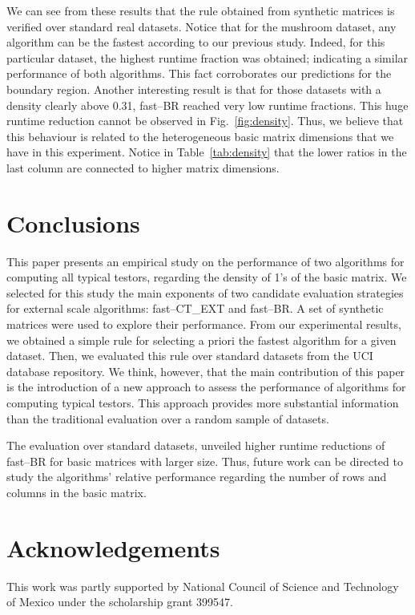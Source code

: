 \documentclass[citenumber]{llncs}
\begin{document}
	We can see from these results that the rule obtained from synthetic matrices is verified over standard real datasets. Notice that for the mushroom dataset, any algorithm can be the fastest according to our previous study. Indeed, for this particular dataset, the highest runtime fraction was obtained; indicating a similar performance of both algorithms. This fact corroborates our predictions for the boundary region. Another interesting result is that for those datasets with a density clearly above 0.31, fast--BR reached very low runtime fractions. This huge runtime reduction cannot be observed in Fig.~\ref{fig:density}. Thus, we believe that this behaviour is related to the heterogeneous basic matrix dimensions that we have in this experiment. Notice in Table~\ref{tab:density} that the lower ratios in the last column are connected to higher matrix dimensions.
 
%
\section{Conclusions} \label{conclusions}
%
 This paper presents an empirical study on the performance of two algorithms for computing all typical testors, regarding the density of 1's of the basic matrix. We selected for this study the main exponents of two candidate evaluation strategies for external scale algorithms: fast--CT\_EXT and fast--BR. A set of synthetic matrices were used to explore their performance. From our experimental results, we obtained a simple rule for selecting a priori the fastest algorithm for a given dataset. Then, we evaluated this rule over standard datasets from the UCI database repository. We think, however, that the main contribution of this paper is the introduction of a new approach to assess the performance of algorithms for computing typical testors. This approach provides more substantial information than the traditional evaluation over a random sample of datasets.
 
 The evaluation over standard datasets, unveiled higher runtime reductions of fast--BR for basic matrices with larger size. Thus, future work can be directed to study the algorithms' relative performance regarding the number of rows and columns in the basic matrix.
 
%
\section{Acknowledgements} \label{Acknowledgements}
%
	This work was partly supported by National Council of Science and Technology of Mexico under the scholarship grant 399547.
\end{document}
